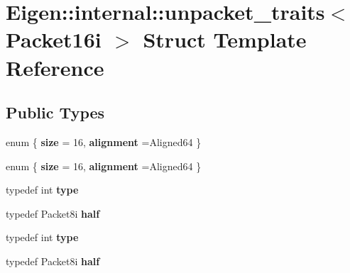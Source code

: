 \hypertarget{struct_eigen_1_1internal_1_1unpacket__traits_3_01_packet16i_01_4}{}\section{Eigen\+:\+:internal\+:\+:unpacket\+\_\+traits$<$ Packet16i $>$ Struct Template Reference}
\label{struct_eigen_1_1internal_1_1unpacket__traits_3_01_packet16i_01_4}
\subsection*{Public Types}
\begin{DoxyCompactItemize}
\item 
\mbox{\label{struct_eigen_1_1internal_1_1unpacket__traits_3_01_packet16i_01_4_a2caf603a3cd451c77ecf8e65ebde24a7}} 
enum \{ {\bfseries size} = 16, 
{\bfseries alignment} =Aligned64
 \}
\item 
\mbox{\label{struct_eigen_1_1internal_1_1unpacket__traits_3_01_packet16i_01_4_a54518a9dd01b78721beb9d9810840ee6}} 
enum \{ {\bfseries size} = 16, 
{\bfseries alignment} =Aligned64
 \}
\item 
\mbox{\label{struct_eigen_1_1internal_1_1unpacket__traits_3_01_packet16i_01_4_afcfe8934cc6b4045b413617dba1f2eee}} 
typedef int {\bfseries type}
\item 
\mbox{\label{struct_eigen_1_1internal_1_1unpacket__traits_3_01_packet16i_01_4_ac0780173c33ecd68c5f9e7281de93a25}} 
typedef Packet8i {\bfseries half}
\item 
\mbox{\label{struct_eigen_1_1internal_1_1unpacket__traits_3_01_packet16i_01_4_afcfe8934cc6b4045b413617dba1f2eee}} 
typedef int {\bfseries type}
\item 
\mbox{\label{struct_eigen_1_1internal_1_1unpacket__traits_3_01_packet16i_01_4_ac0780173c33ecd68c5f9e7281de93a25}} 
typedef Packet8i {\bfseries half}
\end{DoxyCompactItemize}



